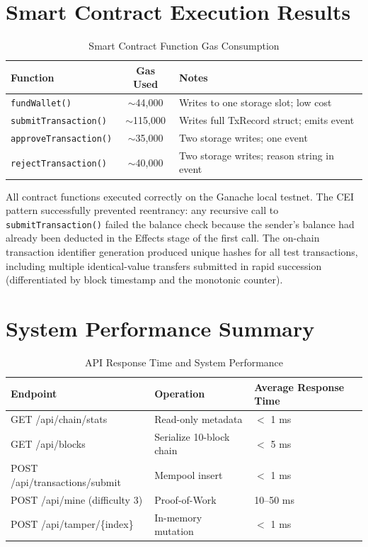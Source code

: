 \documentclass[12pt,a4paper]{report}
\begin{document}
\section{Smart Contract Execution Results}

\begin{table}[H]
\centering
\caption{Smart Contract Function Gas Consumption}
\label{tab:gas}
\begin{tabular}{|l|c|p{6cm}|}
\hline
\textbf{Function} & \textbf{Gas Used} & \textbf{Notes} \\
\hline
\texttt{fundWallet()} & $\sim$44,000 & Writes to one storage slot; low cost \\
\hline
\texttt{submitTransaction()} & $\sim$115,000 & Writes full TxRecord struct; emits event \\
\hline
\texttt{approveTransaction()} & $\sim$35,000 & Two storage writes; one event \\
\hline
\texttt{rejectTransaction()} & $\sim$40,000 & Two storage writes; reason string in event \\
\hline
\end{tabular}
\end{table}

All contract functions executed correctly on the Ganache local testnet. The CEI pattern
successfully prevented reentrancy: any recursive call to \texttt{submitTransaction()} failed
the balance check because the sender's balance had already been deducted in the Effects
stage of the first call. The on-chain transaction identifier generation produced unique
hashes for all test transactions, including multiple identical-value transfers submitted
in rapid succession (differentiated by block timestamp and the monotonic counter).

\section{System Performance Summary}

\begin{table}[H]
\centering
\caption{API Response Time and System Performance}
\label{tab:perf}
\begin{tabular}{|l|l|l|}
\hline
\textbf{Endpoint} & \textbf{Operation} & \textbf{Average Response Time} \\
\hline
GET /api/chain/stats & Read-only metadata & $<$ 1 ms \\
\hline
GET /api/blocks & Serialize 10-block chain & $<$ 5 ms \\
\hline
POST /api/transactions/submit & Mempool insert & $<$ 1 ms \\
\hline
POST /api/mine (difficulty 3) & Proof-of-Work & 10--50 ms \\
\hline
POST /api/tamper/\{index\} & In-memory mutation & $<$ 1 ms \\
\hline
\end{tabular}
\end{table}
\end{document}
